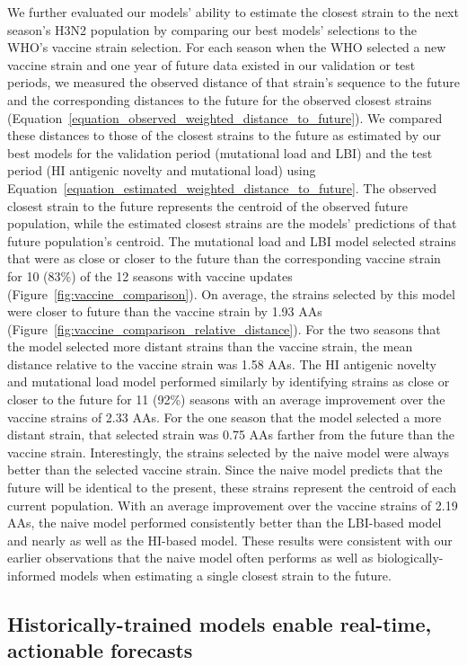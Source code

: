 We further evaluated our models' ability to estimate the closest strain to the next season's H3N2 population by comparing our best models' selections to the WHO's vaccine strain selection.
For each season when the WHO selected a new vaccine strain and one year of future data existed in our validation or test periods, we measured the observed distance of that strain's sequence to the future and the corresponding distances to the future for the observed closest strains (Equation~\ref{equation_observed_weighted_distance_to_future}).
We compared these distances to those of the closest strains to the future as estimated by our best models for the validation period (mutational load and LBI) and the test period (HI antigenic novelty and mutational load) using Equation~\ref{equation_estimated_weighted_distance_to_future}.
The observed closest strain to the future represents the centroid of the observed future population, while the estimated closest strains are the models' predictions of that future population's centroid.
The mutational load and LBI model selected strains that were as close or closer to the future than the corresponding vaccine strain for 10 (83\%) of the 12 seasons with vaccine updates (Figure~\ref{fig:vaccine_comparison}).
On average, the strains selected by this model were closer to future than the vaccine strain by 1.93 AAs (Figure~\ref{fig:vaccine_comparison_relative_distance}).
For the two seasons that the model selected more distant strains than the vaccine strain, the mean distance relative to the vaccine strain was 1.58 AAs.
The HI antigenic novelty and mutational load model performed similarly by identifying strains as close or closer to the future for 11 (92\%) seasons with an average improvement over the vaccine strains of 2.33 AAs.
For the one season that the model selected a more distant strain, that selected strain was 0.75 AAs farther from the future than the vaccine strain.
Interestingly, the strains selected by the naive model were always better than the selected vaccine strain.
Since the naive model predicts that the future will be identical to the present, these strains represent the centroid of each current population.
With an average improvement over the vaccine strains of 2.19 AAs, the naive model performed consistently better than the LBI-based model and nearly as well as the HI-based model.
These results were consistent with our earlier observations that the naive model often performs as well as biologically-informed models when estimating a single closest strain to the future.

\subsection{Historically-trained models enable real-time, actionable forecasts}

